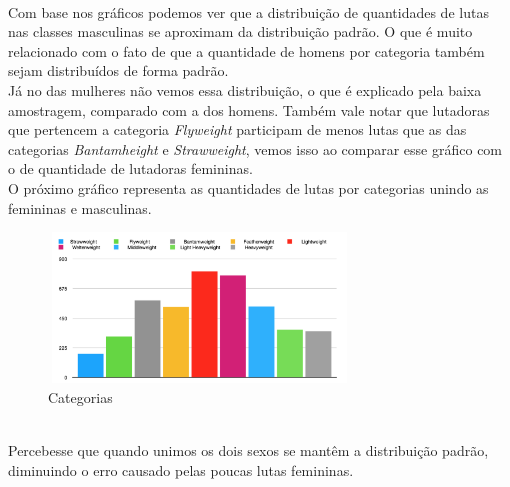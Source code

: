 \documentclass{article}
\begin{document}
\begin{figure}[H]
\centering
{}
\end{figure} \\

Com base nos gráficos podemos ver que a distribuição de quantidades de lutas nas classes masculinas se aproximam da distribuição padrão. O que é muito relacionado com o fato de que a quantidade de homens por categoria também sejam distribuídos de forma padrão. \\

Já no das mulheres não vemos essa distribuição, o que é explicado pela baixa amostragem, comparado com a dos homens. Também vale notar que lutadoras que pertencem a categoria \textit{Flyweight} participam de menos lutas que as das categorias \textit{Bantamheight} e \textit{Strawweight}, vemos isso ao comparar esse gráfico com o de quantidade de lutadoras femininas.\\

O próximo gráfico representa as quantidades de lutas por categorias unindo as femininas e masculinas.\\

\begin{figure}[H]
    \centering
    \includegraphics[width=8cm,height=4cm]{Categorias.png}
    \caption{Categorias}
    \label{fig:my_label}
\end{figure}
\\
Percebesse que quando unimos os dois sexos se mantêm a distribuição padrão, diminuindo o erro causado pelas poucas lutas femininas.\\
\end{document}
